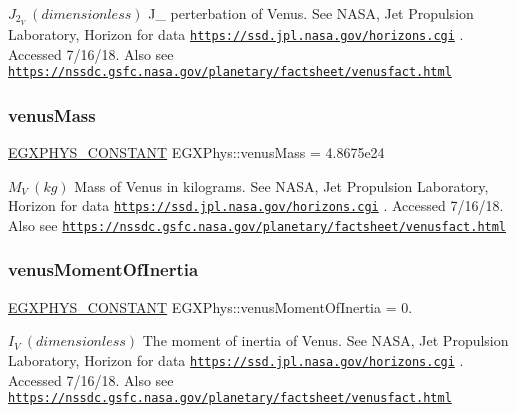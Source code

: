 $ J_{2}_{V} \ (dimensionless)$ J\+\_ perterbation of Venus. See N\+A\+SA, Jet Propulsion Laboratory, Horizon for data \href{https://ssd.jpl.nasa.gov/horizons.cgi}{\tt https\+://ssd.\+jpl.\+nasa.\+gov/horizons.\+cgi} . Accessed 7/16/18. Also see \href{https://nssdc.gsfc.nasa.gov/planetary/factsheet/venusfact.html}{\tt https\+://nssdc.\+gsfc.\+nasa.\+gov/planetary/factsheet/venusfact.\+html} \mbox{\label{group___e_g_x_phys-_constants-_astrophysics-_solar_system-_venus-_bulk_ga5331daa7cd2abe77e1fa8ad9e3534f7d}} 
\subsubsection{\texorpdfstring{venus\+Mass}{venusMass}}
{\footnotesize\ttfamily \mbox{\hyperlink{group___e_g_x_phys-_constants-_macros_ga76980d288494ce1714c9ac68a95ba702}{E\+G\+X\+P\+H\+Y\+S\+\_\+\+C\+O\+N\+S\+T\+A\+NT}} E\+G\+X\+Phys\+::venus\+Mass = 4.\+8675e24}

$M_{V} \ (kg)$ Mass of Venus in kilograms. See N\+A\+SA, Jet Propulsion Laboratory, Horizon for data \href{https://ssd.jpl.nasa.gov/horizons.cgi}{\tt https\+://ssd.\+jpl.\+nasa.\+gov/horizons.\+cgi} . Accessed 7/16/18. Also see \href{https://nssdc.gsfc.nasa.gov/planetary/factsheet/venusfact.html}{\tt https\+://nssdc.\+gsfc.\+nasa.\+gov/planetary/factsheet/venusfact.\+html} \mbox{\label{group___e_g_x_phys-_constants-_astrophysics-_solar_system-_venus-_bulk_gaa3f5213a60c6dfeaf8bd4a770783cd31}} 
\subsubsection{\texorpdfstring{venus\+Moment\+Of\+Inertia}{venusMomentOfInertia}}
{\footnotesize\ttfamily \mbox{\hyperlink{group___e_g_x_phys-_constants-_macros_ga76980d288494ce1714c9ac68a95ba702}{E\+G\+X\+P\+H\+Y\+S\+\_\+\+C\+O\+N\+S\+T\+A\+NT}} E\+G\+X\+Phys\+::venus\+Moment\+Of\+Inertia = 0.}

$ I_{V} \ (dimensionless)$ The moment of inertia of Venus. See N\+A\+SA, Jet Propulsion Laboratory, Horizon for data \href{https://ssd.jpl.nasa.gov/horizons.cgi}{\tt https\+://ssd.\+jpl.\+nasa.\+gov/horizons.\+cgi} . Accessed 7/16/18. Also see \href{https://nssdc.gsfc.nasa.gov/planetary/factsheet/venusfact.html}{\tt https\+://nssdc.\+gsfc.\+nasa.\+gov/planetary/factsheet/venusfact.\+html} \mbox{\label{group___e_g_x_phys-_constants-_astrophysics-_solar_system-_venus-_bulk_gab2414fa95cfd785f97810f384d9c3554}} 
